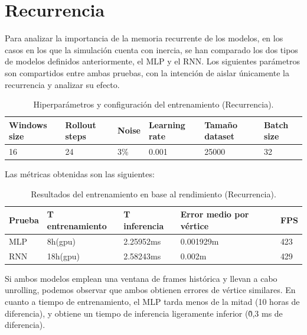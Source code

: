 \section{Recurrencia}
Para analizar la importancia de la memoria recurrente de los modelos, en los casos en los que la simulación cuenta con inercia, se han comparado los dos tipos de modelos definidos anteriormente, el MLP y el RNN. Los siguientes parámetros son compartidos entre ambas pruebas, con la intención de aislar únicamente la recurrencia y analizar su efecto.
\begin{table}[H]
    \begin{center}
        \begin{tabular}{ | m{2.2cm} | m{2cm} | m{1.2cm} | m{2.1cm} | m{2.4cm} | m{2.2cm} | }
        \hline \textbf{Windows size} & \textbf{Rollout steps} & \textbf{Noise} & \textbf{Learning rate} & \textbf{Tamaño dataset} & \textbf{Batch size} \\ \hline
            16 & 24 & 3\% & 0.001 & 25000 & 32 \\ \hline
        \end{tabular}
            \end{center}
    \caption{Hiperparámetros y configuración del entrenamiento (Recurrencia).}
    \label{tab:randomTrainingRec}
\end{table}
Las métricas obtenidas son las siguientes:

\begin{table}[H]
    \begin{center}
        \begin{tabular}{ | m{2.2cm} |  m{2.8cm} | m{2.8cm} | m{2.6cm} | m{1.2cm} |}
        \hline \textbf{Prueba} & \textbf{T entrenamiento} & \textbf{T inferencia} & \textbf{Error medio por vértice} & \textbf{FPS} \\ \hline
            MLP & 8h(gpu) & 2.25952ms & 0.001929m & 423 \\ \hline
            RNN & 18h(gpu) & 2.58243ms & 0.002m & 429 \\ \hline
        \end{tabular}
    \end{center}
    \caption{Resultados del entrenamiento en base al rendimiento (Recurrencia).}
    \label{tab:rendResultsRec}
\end{table}

Si ambos modelos emplean una ventana de frames histórica y llevan a cabo unrolling, podemos observar que ambos obtienen errores de vértice similares. En cuanto a tiempo de entrenamiento, el MLP tarda menos de la mitad (10 horas de diferencia), y obtiene un tiempo de inferencia ligeramente inferior (\~0,3 ms de diferencia). \newline

